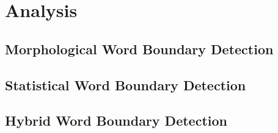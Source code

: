 \chapter{Analysis}

\section{Morphological Word Boundary Detection}

\section{Statistical Word Boundary Detection}

\section{Hybrid Word Boundary Detection}